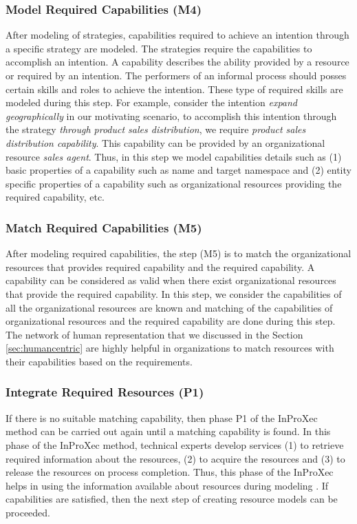 \subsubsection{Model Required Capabilities (M4)}  
After modeling of strategies, capabilities required to achieve an intention through a specific strategy are modeled. The strategies require the capabilities to accomplish an intention. A capability describes the ability provided by a resource or required by an intention. The performers of an informal process should posses certain skills and roles to achieve the intention. These type of required skills are modeled during this step. For example, consider the intention \textit{expand geographically} in our motivating scenario, to accomplish this intention through the strategy \textit{through product sales distribution}, we require \textit{product sales distribution capability}. This capability can be provided by an organizational resource \textit{sales agent}. Thus, in this step we model capabilities details such as (1) basic properties of a capability such as name and target namespace and (2) entity specific properties of a capability such as organizational resources providing the required capability, etc.

\subsubsection{Match Required Capabilities (M5)} 
After modeling required capabilities, the step (M5) is to match the organizational resources that provides required capability and the required capability. A capability can be considered as valid when there exist organizational resources that provide the required capability. In this step, we consider the capabilities of all the organizational resources are known and matching of the capabilities of organizational resources and the required capability are done during this step. The network of human representation that we discussed in the Section \ref{sec:humancentric} are highly helpful in organizations to match resources with their capabilities based on the requirements.

 
\subsubsection{Integrate Required Resources (P1)} 
If there is no suitable matching capability, then phase P1 of the InProXec method can be carried out again until a matching capability is found. In this phase of the InProXec method, technical experts develop services (1) to retrieve required information about the resources, (2) to acquire the resources and (3) to release the resources on process completion. Thus, this phase of the  InProXec helps in using the information available about resources during modeling \cite{Sungur2015}. If capabilities are satisfied, then the next step of creating resource models can be proceeded.

